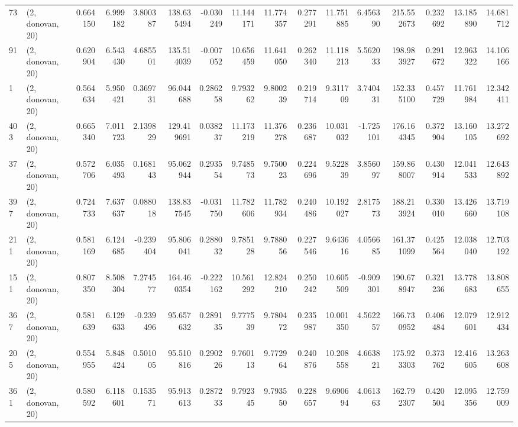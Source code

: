 \begin{tabular}{llrrrrrrrrrrrrrr}
73  &  (2, donovan, 20) &   0.664150 &   6.999182 &   3.800387 &   138.635494 &  -0.030249 &  11.144171 &  11.774357 &  0.277291 &  11.751885 &   6.456390 &   215.552673 &  0.232692 &  13.185890 &  14.681712 \\
91  &  (2, donovan, 20) &   0.620904 &   6.543430 &   4.685501 &   135.514039 &  -0.007052 &  10.656459 &  11.641050 &  0.262340 &  11.118213 &   5.562033 &   198.983927 &  0.291672 &  12.963322 &  14.106166 \\
1   &  (2, donovan, 20) &   0.564634 &   5.950421 &   0.369731 &    96.044688 &   0.286258 &   9.793262 &   9.800239 &  0.219714 &   9.311709 &   3.740431 &   152.335100 &  0.457729 &  11.761984 &  12.342411 \\
403 &  (2, donovan, 20) &   0.665340 &   7.011723 &   2.139829 &   129.419691 &   0.038237 &  11.173219 &  11.376278 &  0.236687 &  10.031032 &  -1.725101 &   176.164345 &  0.372904 &  13.160105 &  13.272692 \\
37  &  (2, donovan, 20) &   0.572706 &   6.035493 &   0.168143 &    95.062944 &   0.293554 &   9.748573 &   9.750023 &  0.224696 &   9.522839 &   3.856097 &   159.868007 &  0.430914 &  12.041533 &  12.643892 \\
397 &  (2, donovan, 20) &   0.724733 &   7.637637 &   0.088018 &   138.837545 &  -0.031750 &  11.782606 &  11.782934 &  0.240486 &  10.192027 &   2.817573 &   188.213924 &  0.330010 &  13.426660 &  13.719108 \\
211 &  (2, donovan, 20) &   0.581169 &   6.124685 &  -0.239404 &    95.806041 &   0.288032 &   9.785128 &   9.788056 &  0.227546 &   9.643616 &   4.056685 &   161.371099 &  0.425564 &  12.038040 &  12.703192 \\
151 &  (2, donovan, 20) &   0.807350 &   8.508304 &   7.274577 &   164.460354 &  -0.222162 &  10.561292 &  12.824210 &  0.250242 &  10.605509 &  -0.909301 &   190.678947 &  0.321236 &  13.778683 &  13.808655 \\
367 &  (2, donovan, 20) &   0.581639 &   6.129633 &  -0.239496 &    95.657632 &   0.289135 &   9.777539 &   9.780472 &  0.235987 &  10.001350 &   4.562257 &   166.730952 &  0.406484 &  12.079601 &  12.912434 \\
205 &  (2, donovan, 20) &   0.554955 &   5.848424 &   0.501005 &    95.510816 &   0.290226 &   9.760113 &   9.772964 &  0.240876 &  10.208558 &   4.663821 &   175.923303 &  0.373762 &  12.416605 &  13.263608 \\
361 &  (2, donovan, 20) &   0.580592 &   6.118601 &   0.153571 &    95.913613 &   0.287233 &   9.792345 &   9.793550 &  0.228657 &   9.690694 &   4.061363 &   162.792307 &  0.420504 &  12.095356 &  12.759009 \\

\end{tabular}
